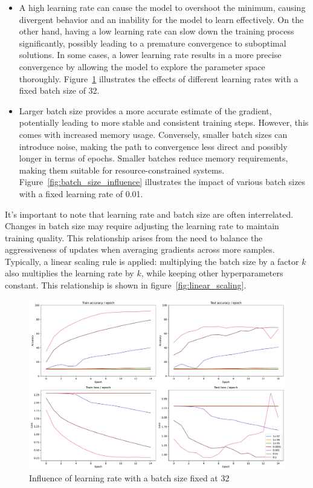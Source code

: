 \documentclass{article}
\theoremstyle{plain}%
\theoremstyle{definition}
\theoremstyle{remark}
\begin{document}
\begin{itemize}
    \item A high learning rate can cause the model to overshoot the minimum, causing divergent behavior and an inability for the model to learn effectively. On the other hand, having a low learning rate can slow down the training process significantly, possibly leading to a premature convergence to suboptimal solutions. In some cases, a lower learning rate results in a more precise convergence by allowing the model to explore the parameter space thoroughly. Figure~\ref{fig:learning_rate_influence} illustrates the effects of different learning rates with a fixed batch size of 32.
    \item Larger batch size provides a more accurate estimate of the gradient, potentially leading to more stable and consistent training steps. However, this comes with increased memory usage. Conversely, smaller batch sizes can introduce noise, making the path to convergence less direct and possibly longer in terms of epochs. Smaller batches reduce memory requirements, making them suitable for resource-constrained systems. Figure~\ref{fig:batch_size_influence} illustrates the impact of various batch sizes with a fixed learning rate of 0.01.

\end{itemize}

It's important to note that learning rate and batch size are often interrelated. Changes in batch size may require adjusting the learning rate to maintain training quality. This relationship arises from the need to balance the aggressiveness of updates when averaging gradients across more samples. Typically, a linear scaling rule is applied: multiplying the batch size by a factor $k$ also multiplies the learning rate by $k$, while keeping other hyperparameters constant. This relationship is shown in figure~\ref{fig:linear_scaling}.

\begin{figure}[H]
    \centering
    \includegraphics*[width=\textwidth]{figs/CNN/learning_rate_influence.pdf}
    \caption{Influence of learning rate with a batch size fixed at 32}
    \label{fig:learning_rate_influence}
\end{figure}
\end{document}

